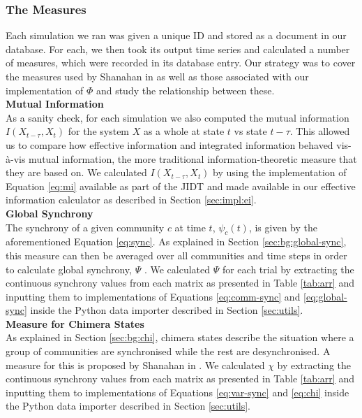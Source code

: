 \documentclass[a4paper,11pt]{article}
\begin{document}
\subsubsection{The Measures}
\label{sec:app:osc:measures}

Each simulation we ran was given a unique ID and stored as a document in our database. For each, we then took its output time series and calculated a number of measures, which were recorded in its database entry. Our strategy was to cover the measures used by Shanahan in \cite{Shanahan2010} as well as those associated with our implementation of $\Phi$ and study the relationship between these.\\

\noindent \textbf{Mutual Information}\\
\noindent As a sanity check, for each simulation we also computed the mutual information $I(X_{t-\tau}, X_{t})$ for the system $X$ as a whole at state $t$ vs state $t-\tau$. This allowed us to compare how effective information and integrated information behaved vis-\`{a}-vis mutual information, the more traditional information-theoretic measure that they are based on. We calculated $I(X_{t-\tau}, X_{t})$ by using the implementation of Equation \ref{eq:mi} available as part of the JIDT and made available in our effective information calculator as described in Section \ref{sec:impl:ei}.\\

\noindent \textbf{Global Synchrony}\\
\noindent The synchrony of a given community $c$ at time $t$, $\psi_c(t)$, is given by the aforementioned Equation \ref{eq:sync}. As explained in Section \ref{sec:bg:global-sync}, this measure can then be averaged over all communities and time steps in order to calculate global synchrony, $\Psi$ \cite{Shanahan2010}. We calculated $\Psi$ for each trial by extracting the continuous synchrony values from each matrix as presented in Table \ref{tab:arr} and inputting them to implementations of Equations \ref{eq:comm-sync} and \ref{eq:global-sync} inside the Python data importer described in Section \ref{sec:utils}.\\

\noindent \textbf{Measure for Chimera States}\\
\noindent As explained in Section \ref{sec:bg:chi}, chimera states describe the situation where a group of communities are synchronised while the rest are desynchronised. A measure for this is proposed by Shanahan in \cite{Shanahan2010}. We calculated $\chi$ by extracting the continuous synchrony values from each matrix as presented in Table \ref{tab:arr} and inputting them to implementations of Equations \ref{eq:var-sync} and \ref{eq:chi} inside the Python data importer described in Section \ref{sec:utils}.\\
\end{document}
